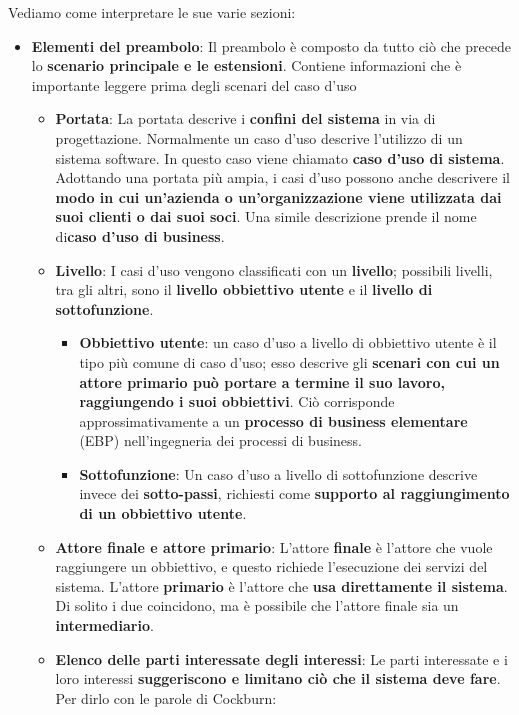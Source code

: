 \documentclass[12pt]{article}
\begin{document}
Vediamo come interpretare le sue varie sezioni:
\begin{itemize}
    \item \textbf{Elementi del preambolo}: Il preambolo è composto da tutto ciò che precede lo \textbf{scenario principale e le estensioni}. Contiene informazioni che è importante leggere prima degli scenari del caso d'uso
    \begin{itemize}
        \item \textbf{Portata}: La portata descrive i \textbf{confini del sistema} in via di progettazione. Normalmente un caso d'uso descrive l'utilizzo di un sistema software. In questo caso viene chiamato \textbf{caso d'uso di sistema}.
        Adottando una portata più ampia, i casi d'uso possono anche descrivere il \textbf{modo in cui un'azienda o un'organizzazione viene utilizzata dai suoi clienti o dai suoi soci}. Una simile descrizione prende il nome di\textbf{caso d'uso di business}.
        \item \textbf{Livello}: I casi d'uso vengono classificati con un \textbf{livello}; possibili livelli, tra gli altri, sono il \textbf{livello obbiettivo utente} e il \textbf{livello di sottofunzione}.
        \begin{itemize}
            \item \textbf{Obbiettivo utente}: un caso d'uso a livello di obbiettivo utente è il tipo più comune di caso d'uso; esso descrive gli \textbf{scenari con cui un attore primario può portare a termine il suo lavoro, raggiungendo i suoi obbiettivi}.
            Ciò corrisponde approssimativamente a un \textbf{processo di business elementare} (EBP) nell'ingegneria dei processi di business.
            \item \textbf{Sottofunzione}: Un caso d'uso a livello di sottofunzione descrive invece dei \textbf{sotto-passi}, richiesti come \textbf{supporto al raggiungimento di un obbiettivo utente}.
        \end{itemize}
        \item \textbf{Attore finale e attore primario}: L'attore \textbf{finale} è l'attore che vuole raggiungere un obbiettivo, e questo richiede l'esecuzione dei servizi del sistema.
        L'attore \textbf{primario} è l'attore che \textbf{usa direttamente il sistema}. Di solito i due coincidono, ma è possibile che l'attore finale sia un \textbf{intermediario}.
        \item \textbf{Elenco delle parti interessate degli interessi}: Le parti interessate e i loro interessi \textbf{suggeriscono e limitano ciò che il sistema deve fare}. Per dirlo con le parole di Cockburn:

\end{itemize}
\end{itemize}
\end{document}
